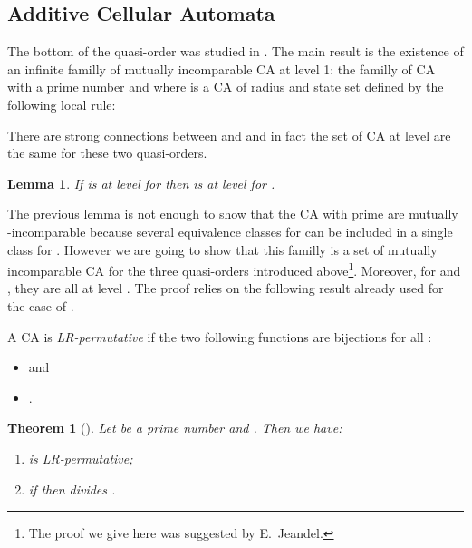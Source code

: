\documentclass[a4paper]{elsarticle}
\def\qed{\relax\ifmmode\hskip2em \blacksquare\else\unskip\nobreak\hfill\hskip1em \fi}
\newtheorem{thm}{Theorem}[section]
\newtheorem{lm}{Lemma}[section]
\begin{document}
\subsection{Additive Cellular Automata}
\label{sec:botadd}

The bottom of the quasi-order  was studied in
\cite{Mazoyer:1999:IOC}. The main result is the existence of an infinite familly
of mutually incomparable CA at level 1: the familly of CA 
with  a prime number and where  is a CA of radius  and
state set  defined by the following local rule:


There are strong connections between  and  and in
fact the set of CA at level  are the same for these two
quasi-orders.

\begin{lm}
  \label{lm:levelone}
  If  is at level  for  then  is at level
   for .
\end{lm}

The previous lemma is not enough to show that the CA
 with  prime are mutually
-incomparable because several equivalence classes for
 can be included in a single class for .  However
we are going to show that this familly is a set of mutually
incomparable CA for the three quasi-orders introduced
above\footnote{The proof we give here was suggested by
  E.~Jeandel.}. Moreover, for  and , they are all
at level . The proof relies on the following result already used
for the case of .

A CA  is \emph{LR-permutative} if the two following
functions are bijections for all :
\begin{itemize}
\item  and
\item .
\end{itemize}

\begin{thm}[\cite{Mazoyer:1998:ACA}]
  \label{thm:mazrapadd}
  Let  be a prime number and . Then we have:
  \begin{enumerate}
  \item  is LR-permutative;
  \item if  then  divides .
  \end{enumerate}
\end{thm}
\end{document}
